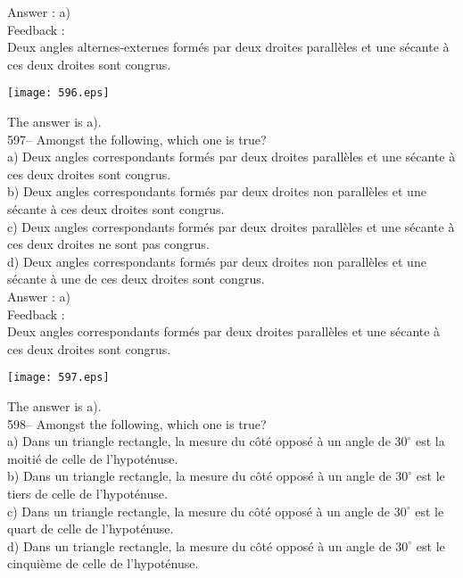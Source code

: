 ﻿\documentclass[letterpaper, 12pt]{article}
\begin{document}
Answer : a)\\

Feedback : \\
Deux angles alternes-externes form\'es par deux droites parall\`eles
et une s\'ecante \`a ces deux droites sont congrus.   \begin{center}
    \texttt{[image: 596.eps]}
    \end{center}  The answer is a).\\

597-- Amongst the following, which one is true?\\
a) Deux angles correspondants form\'es par deux droites parall\`eles et une
s\'ecante \`a ces deux droites sont congrus.\\
b) Deux angles correspondants form\'es par deux droites non parall\`eles et
une s\'ecante \`a ces deux droites sont congrus.\\
c) Deux angles correspondants form\'es par deux droites parall\`eles et une
s\'ecante \`a ces deux droites ne sont pas congrus.\\
d) Deux angles correspondants form\'es par deux droites non parall\`eles et
une s\'ecante \`a une de ces deux droites sont congrus.\\

Answer : a)\\

Feedback : \\
Deux angles correspondants form\'es par deux droites parall\`eles et
une s\'ecante \`a ces deux droites sont congrus.   \begin{center}
    \texttt{[image: 597.eps]}
    \end{center}  The answer is a).\\

598-- Amongst the following, which one is true?\\
a) Dans un triangle rectangle, la mesure du c\^ot\'e oppos\'e \`a un angle
de $30^{\circ}$ est la moiti\'e de celle de l'hypot\'enuse.\\
b) Dans un triangle rectangle, la mesure du c\^ot\'e oppos\'e \`a un angle
de $30^{\circ}$ est le tiers de celle de l'hypot\'enuse. \\
c) Dans un triangle rectangle, la mesure du c\^ot\'e oppos\'e \`a un angle
de $30^{\circ}$ est le quart de celle de l'hypot\'enuse.  \\
d) Dans un triangle rectangle, la mesure du c\^ot\'e oppos\'e \`a un angle
de $30^{\circ}$ est le cinqui\`eme de celle de l'hypot\'enuse.  \\
\end{document}
